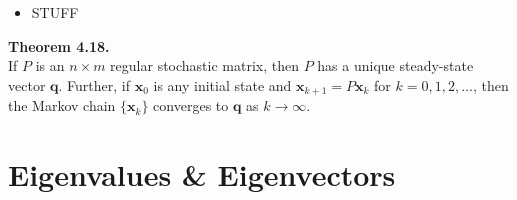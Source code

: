 \documentclass[10pt]{book}
\newenvironment{boxthm}{\begin{mdframed}[backgroundcolor=gray!30,nobreak=true]}{\end{mdframed}}
\newcommand{\vect}[1]{\ensuremath{\boldsymbol{\mathbf{#1}}}}
\begin{document}
\begin{itemize}
	\item STUFF
\end{itemize}

\begin{boxthm}
	\textbf{Theorem 4.18.} \\
	If $P$ is an $n\times m$ regular stochastic matrix, then $P$ has a unique steady-state vector $\vect{q}$. Further, if $\vect{x}_0$ is any initial state and $\vect{x}_{k+1}=P\vect{x}_k$ for $k=0,1,2,\ldots$, then the Markov chain $\{\vect{x}_k\}$ converges to $\vect{q}$ as $k\rightarrow\infty$.
\end{boxthm}


\newpage


\chapter{Eigenvalues \& Eigenvectors}
\end{document}
